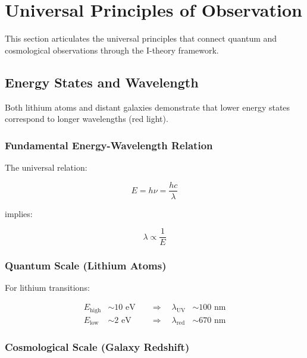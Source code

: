 \section{Universal Principles of Observation}
\label{sec:universal_principles}

This section articulates the universal principles that connect quantum and cosmological observations through the I-theory framework.

\subsection{Energy States and Wavelength}
\label{subsec:energy_wavelength}

Both lithium atoms and distant galaxies demonstrate that lower energy states correspond to longer wavelengths (red light).

\subsubsection{Fundamental Energy-Wavelength Relation}

The universal relation:

\begin{equation}
\label{eq:energy_wavelength}
E = h\nu = \frac{hc}{\lambda}
\end{equation}

implies:

\begin{equation}
\label{eq:wavelength_energy_inverse}
\lambda \propto \frac{1}{E}
\end{equation}

\subsubsection{Quantum Scale (Lithium Atoms)}

For lithium transitions:

\begin{align}
\label{eq:lithium_high_energy}
E_{\text{high}} &\sim 10 \text{ eV} \quad &\Rightarrow \quad \lambda_{\text{UV}} &\sim 100 \text{ nm} \\
\label{eq:lithium_low_energy}
E_{\text{low}} &\sim 2 \text{ eV} \quad &\Rightarrow \quad \lambda_{\text{red}} &\sim 670 \text{ nm}
\end{align}

\subsubsection{Cosmological Scale (Galaxy Redshift)}

